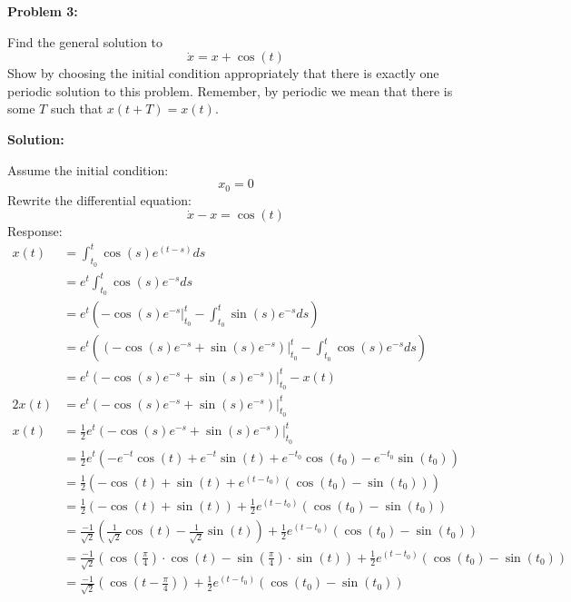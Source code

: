 \documentclass[12pt]{article}
\newenvironment{problem}[1]{
    \textbf{Problem #1:}
}{
    \rmfamily \vspace{1em}
}
\newenvironment{solution}{
    \textbf{Solution:}
    
}{
    
    \vspace{2em}
}
\begin{document}
\begin{problem}{3}
    Find the general solution to
    \[
        \dot{x} = x + \cos(t)
    \]
    Show by choosing the initial condition appropriately that there is exactly one periodic solution to this problem. Remember, by periodic
we mean that there is some \(T\) such that \(x(t + T) = x(t)\).
\end{problem}

\begin{solution}
Assume the initial condition:
    \[
        x_0 = 0
    \]
Rewrite the differential equation:
    \[
        \dot{x} - x = \cos(t)
    \]
Response:
    \[
        \begin{aligned}
            x(t) &= \int_{t_0}^t \cos(s)e^{(t-s)}ds\\
            &= e^{t}\int_{t_0}^t \cos(s)e^{-s}ds\\
            &= e^{t}\left(-\cos(s)e^{-s}\Big|_{t_0}^t-\int_{t_0}^t \sin(s)e^{-s}ds\right)\\
            &= e^{t}\left((-\cos(s)e^{-s}+\sin(s)e^{-s})\Big|_{t_0}^t - \int_{t_0}^t \cos(s)e^{-s}ds\right)\\
            &= e^{t}\left(-\cos(s)e^{-s}+\sin(s)e^{-s}\right)\Big|_{t_0}^t - x(t)\\
            2x(t) &= e^{t}\left(-\cos(s)e^{-s}+\sin(s)e^{-s}\right)\Big|_{t_0}^t\\
            x(t) &= \frac{1}{2} e^{t}\left(-\cos(s)e^{-s}+\sin(s)e^{-s}\right)\Big|_{t_0}^t\\
            &= \frac{1}{2} e^{t} \left(-e^{-t}\cos(t)+e^{-t}\sin(t)+e^{-t_0}\cos(t_0)-e^{-t_0}\sin(t_0) \right)\\
            &= \frac{1}{2} \left(-\cos(t) + \sin(t) + e^{(t-t_0)}(\cos(t_0)-\sin(t_0))\right)\\
            &= \frac{1}{2} \left(-\cos(t) + \sin(t)\right)+ \frac{1}{2}e^{(t-t_0)} \left(\cos(t_0)-\sin(t_0)\right)\\
            &= \frac{-1}{\sqrt{2}} \left(\frac{1}{\sqrt{2}} \cos(t) - \frac{1}{\sqrt{2}}\sin(t)\right) + \frac{1}{2}e^{(t-t_0)} \left(\cos(t_0)-\sin(t_0)\right)\\
            &= \frac{-1}{\sqrt{2}} \left(\cos(\frac{\pi}{4}) \cdot \cos(t) - \sin(\frac{\pi}{4}) \cdot \sin(t)\right) + \frac{1}{2}e^{(t-t_0)} \left(\cos(t_0)-\sin(t_0)\right)\\
            &= \frac{-1}{\sqrt{2}} \left(\cos(t-\frac{\pi}{4})\right) + \frac{1}{2}e^{(t-t_0)} \left(\cos(t_0)-\sin(t_0)\right)\\
        \end{aligned}
\]
\end{solution}
\end{document}
